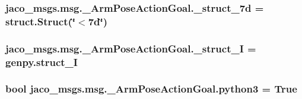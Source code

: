 \subsubsection[{\texorpdfstring{\+\_\+struct\+\_\+7d}{_struct_7d}}]{\setlength{\rightskip}{0pt plus 5cm}jaco\+\_\+msgs.\+msg.\+\_\+\+Arm\+Pose\+Action\+Goal.\+\_\+struct\+\_\+7d = struct.\+Struct(\char`\"{}$<$7d\char`\"{})\hspace{0.3cm}{\ttfamily [private]}}\hypertarget{namespacejaco__msgs_1_1msg_1_1__ArmPoseActionGoal_a91b19221710bf188dcc3450fedb41cbc}{}\label{namespacejaco__msgs_1_1msg_1_1__ArmPoseActionGoal_a91b19221710bf188dcc3450fedb41cbc}
\subsubsection[{\texorpdfstring{\+\_\+struct\+\_\+I}{_struct_I}}]{\setlength{\rightskip}{0pt plus 5cm}jaco\+\_\+msgs.\+msg.\+\_\+\+Arm\+Pose\+Action\+Goal.\+\_\+struct\+\_\+I = genpy.\+struct\+\_\+I\hspace{0.3cm}{\ttfamily [private]}}\hypertarget{namespacejaco__msgs_1_1msg_1_1__ArmPoseActionGoal_a411b8f5fab463c221ba6c839e37e6b3e}{}\label{namespacejaco__msgs_1_1msg_1_1__ArmPoseActionGoal_a411b8f5fab463c221ba6c839e37e6b3e}
\subsubsection[{\texorpdfstring{python3}{python3}}]{\setlength{\rightskip}{0pt plus 5cm}bool jaco\+\_\+msgs.\+msg.\+\_\+\+Arm\+Pose\+Action\+Goal.\+python3 = True}\hypertarget{namespacejaco__msgs_1_1msg_1_1__ArmPoseActionGoal_af488dbf1eb6c65d727bb732caee65289}{}\label{namespacejaco__msgs_1_1msg_1_1__ArmPoseActionGoal_af488dbf1eb6c65d727bb732caee65289}

